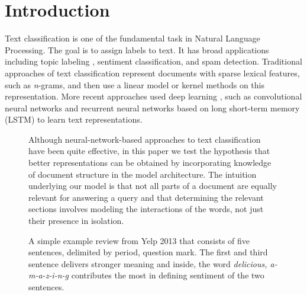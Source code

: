 
\section{Introduction}
Text classification is one of the fundamental task in Natural Language Processing. The goal is to assign labels to text. It has broad applications including topic labeling \citep{Dzmitry2014}, sentiment classification, and spam detection. Traditional approaches of text classification represent documents with sparse lexical features, such as \emph{n}-grams, and then use a linear model or kernel methods on this representation. More recent approaches used deep learning , such as convolutional neural networks and recurrent neural networks based on long short-term memory (LSTM) to learn text representations. 

\begin{figure} [h]
\caption{A simple example review from Yelp 2013 that consists of five sentences, delimited by period, question mark. The first and third sentence delivers stronger meaning and inside, the word \emph{delicious, a-m-a-z-i-n-g} contributes the most in defining sentiment of the two sentences.}\label{fig1}

Although neural-network-based approaches to text classification have been quite effective, in this paper we test the hypothesis that better representations can be obtained by incorporating knowledge of document structure in the model architecture. The intuition underlying our model is that not all parts of a document are equally relevant for answering a query and that determining the relevant sections involves modeling the interactions of the words, not just their presence in isolation.


\end{figure}
